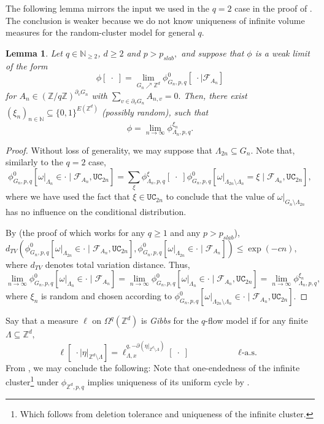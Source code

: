 \documentclass[article,11pt,reqno]{amsart}
\newtheorem{lemma}[theorem]{Lemma}
\begin{document}
The following lemma mirrors the input we used in the $q=2$ case in the proof of . The conclusion is weaker because we do not know uniqueness of infinite volume measures for the random-cluster model for general $q$.
\begin{lemma} \label{Source relaxation}
Let $q\in \mathbb{N}_{\geq 2}$, $d\geq 2$ and $p>p_{slab},$ and suppose that $\phi$ is a weak limit of the form
$$
\phi[\;\cdot\;]=\lim_{G_n\nearrow \mathbb{Z}^d}\phi^0_{G_n,p,q}[\;\cdot\mid \mathcal{F}_{A_n} ]
$$
for $A_n\in (\mathbb{Z}/q\mathbb{Z})^{\partial_vG_n}$ with $\sum_{v\in \partial_vG_n} A_{n,v}=0.$ Then, there exist $(\xi_n)_{n\in\mathbb{N}}\subseteq  \{0,1\}^{E(\mathbb{Z}^d)}$ (possibly random), such that
$$
\phi=\lim_{n\to\infty} \phi^{\xi_n}_{\Lambda_{n},p,q}.
$$
\end{lemma}
\begin{proof}
Without loss of generality, we may suppose that $\Lambda_{2n}\subseteq G_n.$ Note that, similarly to the $q=2$ case,
$$
\phi^0_{G_n,p,q}[\omega|_{\Lambda_n}\in\cdot  \mid \mathcal{F}_{A_n},\mathtt{UC}_{2n}]=\sum_{\xi} \phi^{\xi}_{\Lambda_n,p,q}[\;\cdot\;]\phi^0_{G_n,p,q}[\omega|_{\Lambda_{2n}\setminus \Lambda_n}=\xi \mid \mathcal{F}_{A_n},\mathtt{UC}_{2n}],
$$
where we have used the fact that $\xi\in \mathtt{UC}_{2n}$ to conclude that the value of $\omega|_{G_n\setminus \Lambda_{2n}}$ has no influence on the conditional distribution.

By  (the proof of which works for any  $q \geq 1$ and any $p>p_{slab}$),  $d_{TV}(\phi^0_{G_n,p,q}[\omega|_{\Lambda_{2n}}\in\cdot  \mid \mathcal{F}_{A_n},\mathtt{UC}_{2n}],\phi^0_{G_n,p,q}[\omega|_{\Lambda_{2n}}\in\cdot  \mid \mathcal{F}_{A_n}])\leq \exp(-cn),$ where $d_{TV}$ denotes total variation distance. Thus,
$$
\lim_{n\to\infty}\phi^0_{G_n,p,q}[\omega|_{\Lambda_{n}}\in\cdot  \mid \mathcal{F}_{A_n}]=\lim_{n\to\infty} \phi^0_{G_n,p,q}[\omega|_{\Lambda_n}\in\cdot  \mid \mathcal{F}_{A_n},\mathtt{UC}_{2n}]=\lim_{n\to\infty}\phi^{\xi_n}_{\Lambda_n,p,q},
$$
where $\xi_n$ is random and chosen according to $\phi^0_{G_n,p,q}[\omega|_{\Lambda_{2n}\setminus \Lambda_n} \in \cdot \mid \mathcal{F}_{A_n},\mathtt{UC}_{2n}]$.
\end{proof}

Say that a measure $\ell$ on $\Omega^q(\mathbb{Z}^d)$ is \textit{Gibbs} for the $q$-flow model if for any finite 
$\Lambda\subseteq \mathbb{Z}^d,$ $$\ell[\;\cdot\mid \eta|_{\mathbb{Z}^d\setminus \Lambda}]= \ell^{q,-\partial (\eta|_{\mathbb{Z}^d\setminus \Lambda})}_{\Lambda,x}[\;\cdot\;] \hspace{2cm} \text{        $\ell$-a.s. }$$  From , we may conclude the following: Note that one-endedness of the infinite cluster\footnote{Which follows from deletion tolerance and uniqueness of the infinite cluster.} under $\phi_{\mathbb{Z}^d,p,q}$ implies uniqueness of its uniform cycle by .
\end{document}
